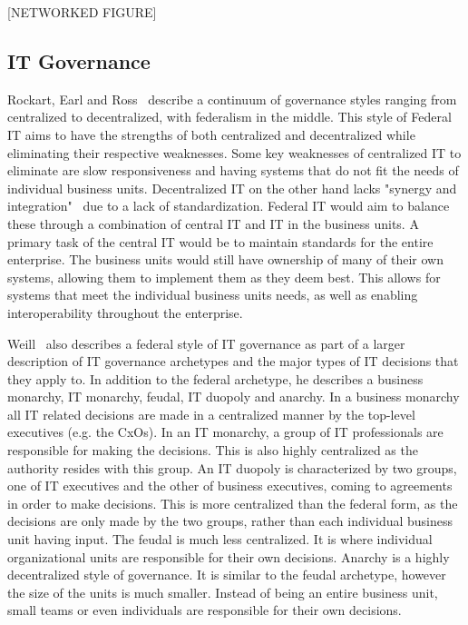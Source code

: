 [NETWORKED FIGURE]

\subsection{IT Governance}

Rockart, Earl and Ross~\cite{Rockart1996} describe a continuum of governance styles ranging from centralized to decentralized, with federalism in the middle. This style of Federal IT aims to have the strengths of both centralized and decentralized while eliminating their respective weaknesses. Some key weaknesses of centralized IT to eliminate are slow responsiveness and having systems that do not fit the needs of individual business units. Decentralized IT on the other hand lacks "synergy and integration"~\cite{Rockart1996} due to a lack of standardization. Federal IT would aim to balance these through a combination of central IT and IT in the business units. A primary task of the central IT would be to maintain standards for the entire enterprise. The business units would still have ownership of many of their own systems, allowing them to implement them as they deem best. This allows for systems that meet the individual business units needs, as well as enabling interoperability throughout the enterprise. 

Weill~\cite{Weill2004} also describes a federal style of IT governance as part of a larger description of IT governance archetypes and the major types of IT decisions that they apply to. In addition to the federal archetype, he describes a business monarchy, IT monarchy, feudal, IT duopoly and anarchy. In a business monarchy all IT related decisions are made in a centralized manner by the top-level executives (e.g. the CxOs). In an IT monarchy, a group of IT professionals are responsible for making the decisions. This is also highly centralized as the authority resides with this group. An IT duopoly is characterized by two groups, one of IT executives and the other of business executives, coming to agreements in order to make decisions. This is more centralized than the federal form, as the decisions are only made by the two groups, rather than each individual business unit having input. The feudal is much less centralized. It is where individual organizational units are responsible for their own decisions. Anarchy is a highly decentralized style of governance. It is similar to the feudal archetype, however the size of the units is much smaller. Instead of being an entire business unit, small teams or even individuals are responsible for their own decisions.

